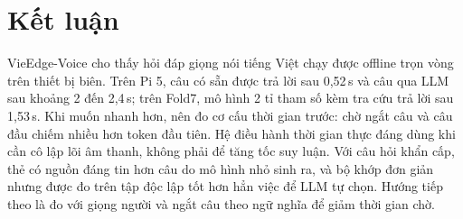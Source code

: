 \documentclass[a4paper,12pt,twocolumn]{article}
\begin{document}
\section{Kết luận}
VieEdge-Voice cho thấy hỏi đáp giọng nói tiếng Việt chạy được offline trọn vòng trên thiết bị biên. Trên Pi 5, câu có sẵn được trả lời sau 0,52\,s và câu qua LLM sau khoảng 2 đến 2,4\,s; trên Fold7, mô hình 2 tỉ tham số kèm tra cứu trả lời sau 1,53\,s. Khi muốn nhanh hơn, nên đo cơ cấu thời gian trước: chờ ngắt câu và câu đầu chiếm nhiều hơn token đầu tiên. Hệ điều hành thời gian thực đáng dùng khi cần cô lập lõi âm thanh, không phải để tăng tốc suy luận. Với câu hỏi khẩn cấp, thẻ có nguồn đáng tin hơn câu do mô hình nhỏ sinh ra, và bộ khớp đơn giản nhưng được đo trên tập độc lập tốt hơn hẳn việc để LLM tự chọn. Hướng tiếp theo là đo với giọng người và ngắt câu theo ngữ nghĩa để giảm thời gian chờ.

\balance
\end{document}
